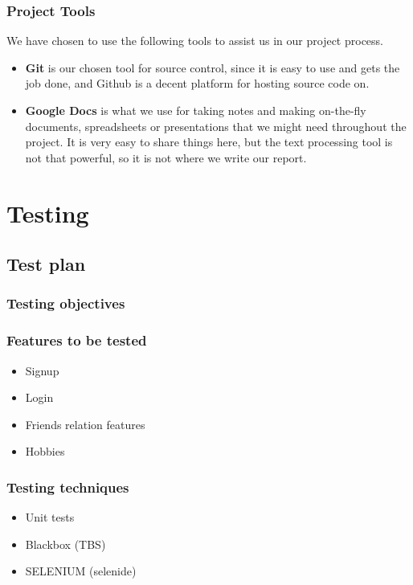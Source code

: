 \documentclass[a4paper]{article}
\begin{document}
\subsubsection{Project Tools}
We have chosen to use the following tools to assist us in our project process.
\begin{itemize}
\item \textbf{Git} is our chosen tool for source control, since it is easy to use and gets the job done, and Github is a decent platform for hosting source code on.
\item \textbf{Google Docs} is what we use for taking notes and making on-the-fly documents, spreadsheets or presentations that we might need throughout the project. It is very easy to share things here, but the text processing tool is not that powerful, so it is not where we write our report.
\end{itemize}


\section{Testing}

\subsection{Test plan}
\subsubsection{Testing objectives}
\subsubsection{Features to be tested}
\begin{itemize}

\item Signup
\item Login
\item Friends relation features
\item Hobbies

\end{itemize}
\subsubsection{Testing techniques}
\begin{itemize}

\item Unit tests
\item Blackbox (TBS)
\item SELENIUM (selenide)
\end{itemize}
\end{document}
